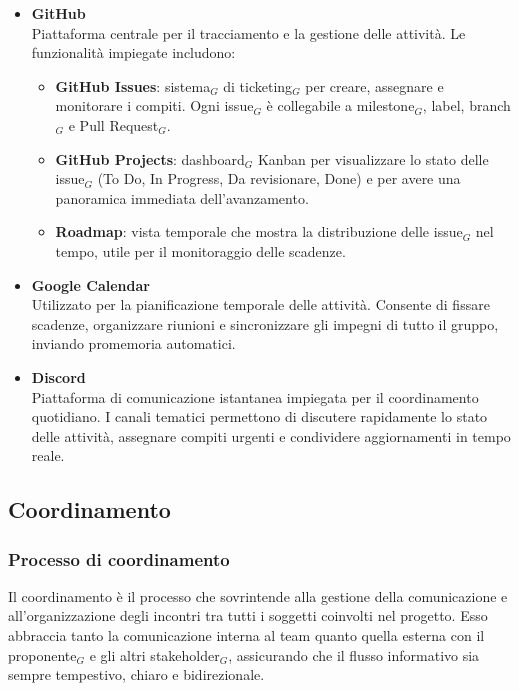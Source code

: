 \documentclass[a4paper, 10pt]{article}
\begin{document}
\begin{itemize}
    \item \textbf{GitHub}\\
    Piattaforma centrale per il tracciamento e la gestione delle attività. Le funzionalità impiegate includono:
    \begin{itemize}
        \item \textbf{GitHub Issues}: sistema$_G$ di ticketing$_G$ per creare, assegnare e monitorare i compiti. Ogni issue$_G$ è collegabile a milestone$_G$, label, branch$_G$ e Pull Request$_G$.
        \item \textbf{GitHub Projects}: dashboard$_G$ Kanban per visualizzare lo stato delle issue$_G$ (To Do, In Progress, Da revisionare, Done) e per avere una panoramica immediata dell'avanzamento.
        \item \textbf{Roadmap}: vista temporale che mostra la distribuzione delle issue$_G$ nel tempo, utile per il monitoraggio delle scadenze.
    \end{itemize}

    \item \textbf{Google Calendar}\\
    Utilizzato per la pianificazione temporale delle attività. Consente di fissare scadenze, organizzare riunioni e sincronizzare gli impegni di tutto il gruppo, inviando promemoria automatici.

    \item \textbf{Discord}\\
    Piattaforma di comunicazione istantanea impiegata per il coordinamento quotidiano. I canali tematici permettono di discutere rapidamente lo stato delle attività, assegnare compiti urgenti e condividere aggiornamenti in tempo reale.
\end{itemize}

\subsection{Coordinamento}
\label{subsec:coordinamento}

\subsubsection{Processo di coordinamento}
\label{subsubsec:processo_coordinamento}

Il coordinamento è il processo che sovrintende alla gestione della comunicazione e all'organizzazione degli incontri tra tutti i soggetti coinvolti nel progetto. Esso abbraccia tanto la comunicazione interna al team quanto quella esterna con il proponente$_G$ e gli altri stakeholder$_G$, assicurando che il flusso informativo sia sempre tempestivo, chiaro e bidirezionale.
\end{document}

